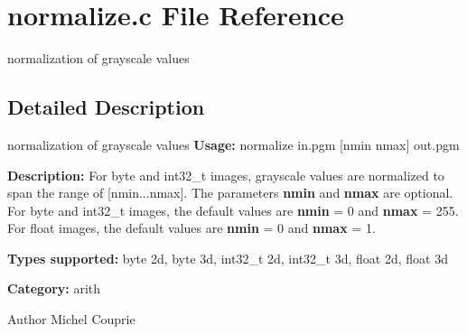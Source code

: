 \section{normalize.c File Reference}
\label{normalize_8c}


normalization of grayscale values  




\subsection{Detailed Description}
normalization of grayscale values {\bfseries Usage:} normalize in.pgm [nmin nmax] out.pgm

{\bfseries Description:} For byte and int32\_\-t images, grayscale values are normalized to span the range of [nmin...nmax]. The parameters {\bfseries nmin} and {\bfseries nmax} are optional. For byte and int32\_\-t images, the default values are {\bfseries nmin} = 0 and {\bfseries nmax} = 255. For float images, the default values are {\bfseries nmin} = 0 and {\bfseries nmax} = 1.

{\bfseries Types supported:} byte 2d, byte 3d, int32\_\-t 2d, int32\_\-t 3d, float 2d, float 3d

{\bfseries Category:} arith

\begin{DoxyAuthor}{Author}
Michel Couprie 
\end{DoxyAuthor}
